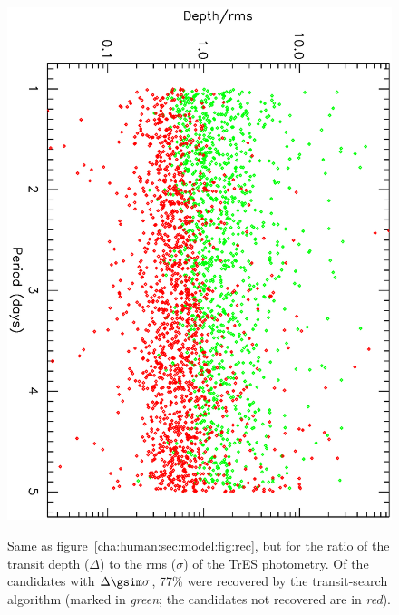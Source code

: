 \begin{figure}
\begin{center}
\centering
\includegraphics[width=.75\textwidth, angle=90]{7_comp_c} \\
\caption[Ratio of $\Delta$ to $\sigma$ versus period for BLS-recovered transits]{%
Same as figure~\ref{cha:human:sec:model:fig:rec}, but for the ratio of the transit depth ($\Delta$) to the rms ($\sigma$) of the TrES photometry.
Of the candidates with $\Delta\gsim\sigma$, 77\% were recovered by the transit-search algorithm (marked in {\it green}; the candidates not recovered are in {\it red}).%
}
\label{cha:human:sec:model:fig:ratiorec}
\end{center}
\end{figure}

